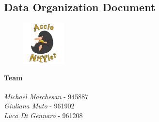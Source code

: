 \begin{titlepage}

\section*{Data Organization Document}

\begin{figure}
	\centering
	\includegraphics[max width=0.2\textwidth]{../Pictures/Niffler_logo.png}
\end{figure}

\textbf{Team} \\ \\
\textit{Michael Marchesan} - 945887 \\
\textit{Giuliana Muto} - 961902 \\
\textit{Luca Di Gennaro} - 961208

\end{titlepage}

